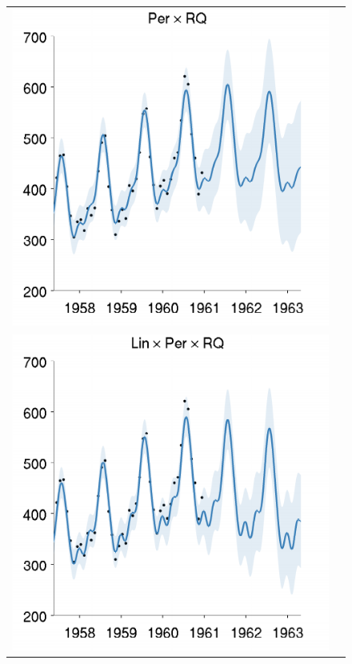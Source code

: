 \documentclass[twoside]{article}
\begin{document}
\begin{figure}[h!]
\begin{tabular}{cc}
\hspace{-1cm} \includegraphics[width=\wag,height=\hag]{../figures/decomposition/01-airline-s_max_level_1/01-airline-s_all_small} \\
\hspace{-1cm} \includegraphics[width=\wag,height=\hag]{../figures/decomposition/01-airline-s_max_level_2/01-airline-s_all_small} 

\end{tabular}
\end{figure}
\end{document}
